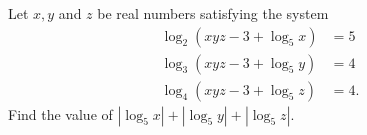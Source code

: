Let $x,y$ and $z$ be real numbers satisfying the system \begin{align*}
\log_2(xyz-3+\log_5 x) &= 5 \\
\log_3(xyz-3+\log_5 y) &= 4 \\
\log_4(xyz-3+\log_5 z) &= 4.
\end{align*}Find the value of $|\log_5 x|+|\log_5 y|+|\log_5 z|$.